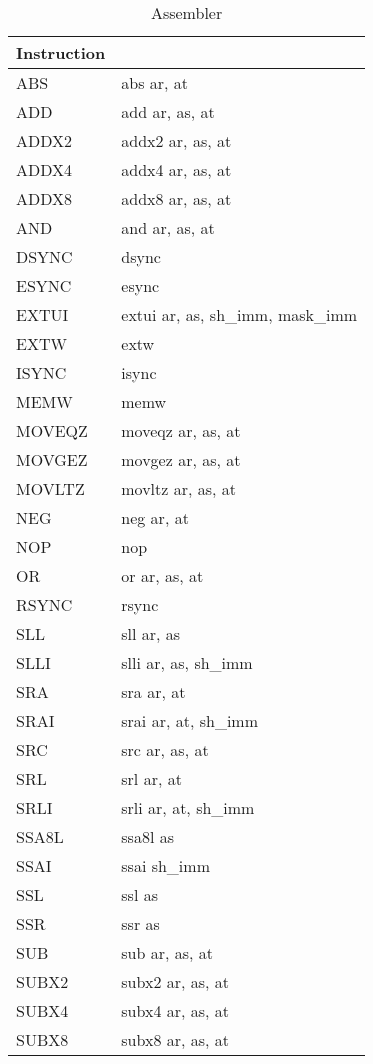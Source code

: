	\begin{longtable}{|p{5cm}|p{5cm}|}
		\caption{Assembler\label{long}}\\
		\hline
		Instruction & \\
		\hline
        \endhead
		ABS & abs ar, at\\ \hline
		ADD & add ar, as, at\\ \hline
		ADDX2 & addx2 ar, as, at\\ \hline
		ADDX4 & addx4 ar, as, at\\ \hline
		ADDX8 & addx8 ar, as, at\\ \hline
		AND & and ar, as, at\\ \hline
		DSYNC & dsync\\ \hline
		ESYNC & esync\\ \hline
		EXTUI & extui ar, as, sh\_imm, mask\_imm\\ \hline
		EXTW & extw\\ \hline
		ISYNC & isync\\ \hline
		MEMW & memw\\ \hline
		MOVEQZ & moveqz ar, as, at\\ \hline
		MOVGEZ & movgez ar, as, at\\ \hline
		MOVLTZ & movltz ar, as, at\\ \hline
		NEG & neg ar, at\\ \hline
		NOP & nop\\ \hline
		OR & or ar, as, at\\ \hline
		RSYNC & rsync\\ \hline
		SLL & sll ar, as\\ \hline
		SLLI & slli ar, as, sh\_imm\\ \hline
		SRA & sra ar, at\\ \hline
		SRAI & srai ar, at, sh\_imm\\ \hline
		SRC & src ar, as, at\\ \hline
		SRL & srl ar, at\\ \hline
		SRLI & srli ar, at, sh\_imm\\ \hline
		SSA8L & ssa8l as\\ \hline
		SSAI & ssai sh\_imm\\ \hline
		SSL & ssl as\\ \hline
		SSR & ssr as\\ \hline
		SUB & sub ar, as, at\\ \hline
        SUBX2 & subx2 ar, as, at\\ \hline
        SUBX4 & subx4 ar, as, at\\ \hline
        SUBX8 & subx8 ar, as, at\\ \hline
	\end{longtable}
